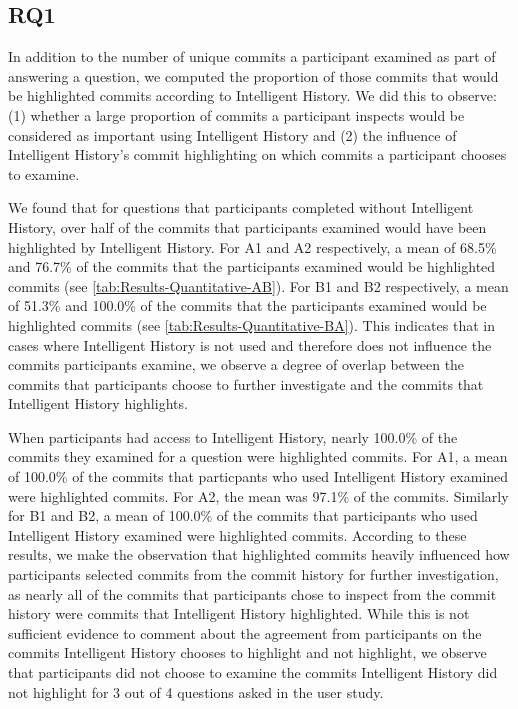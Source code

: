 
\subsection{RQ1}
\label{subsec:RQ1}


In addition to the number of unique commits a participant examined as part of answering a question,
we computed the proportion of those commits that would be highlighted commits according to Intelligent History.
We did this to observe:
(1) whether a large proportion of commits a participant inspects would be considered as important using Intelligent History
and (2) the influence of Intelligent History's commit highlighting on which commits a participant chooses to examine.

We found that for questions that participants completed without Intelligent History,
over half of the commits that participants examined would have been highlighted by Intelligent History.
For A1 and A2 respectively, a mean of 68.5\% and 76.7\% 
of the commits that the participants examined would be highlighted commits (see \autoref{tab:Results-Quantitative-AB}).
For B1 and B2 respectively, a mean of 51.3\% and 100.0\% 
of the commits that the participants examined would be highlighted commits (see \autoref{tab:Results-Quantitative-BA}).
This indicates that in cases where Intelligent History is not used and therefore does not influence the commits participants examine,
we observe a degree of overlap between the commits that participants choose to further investigate and the commits that Intelligent History highlights.

When participants had access to Intelligent History,
nearly 100.0\% of the commits they examined for a question were highlighted commits.
For A1, a mean of 100.0\% of the commits that particpants who used Intelligent History examined were highlighted commits.
For A2, the mean was 97.1\% of the commits.
Similarly for B1 and B2, a mean of 100.0\% of the commits that participants who used Intelligent History examined were highlighted commits.
According to these results, we make the observation that highlighted commits heavily 
influenced how participants selected commits from the commit history for further investigation, as
nearly all of the commits that participants chose to inspect from the commit history were commits that Intelligent History highlighted.
While this is not sufficient evidence to comment about the agreement from participants on the commits Intelligent History
chooses to highlight and not highlight,
we observe that participants did not choose to examine the commits Intelligent History did not highlight
for 3 out of 4 questions asked in the user study.

